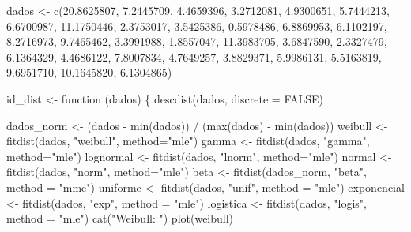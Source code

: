 \documentclass[
  letterpaper,
  DIV=11,
  numbers=noendperiod]{scrartcl}
\newenvironment{Shaded}{\begin{snugshade}}{\end{snugshade}}
\newcommand{\AttributeTok}[1]{\textcolor[rgb]{0.40,0.45,0.13}{#1}}
\newcommand{\ConstantTok}[1]{\textcolor[rgb]{0.56,0.35,0.01}{#1}}
\newcommand{\ControlFlowTok}[1]{\textcolor[rgb]{0.00,0.23,0.31}{#1}}
\newcommand{\FloatTok}[1]{\textcolor[rgb]{0.68,0.00,0.00}{#1}}
\newcommand{\FunctionTok}[1]{\textcolor[rgb]{0.28,0.35,0.67}{#1}}
\newcommand{\NormalTok}[1]{\textcolor[rgb]{0.00,0.23,0.31}{#1}}
\newcommand{\OtherTok}[1]{\textcolor[rgb]{0.00,0.23,0.31}{#1}}
\newcommand{\SpecialCharTok}[1]{\textcolor[rgb]{0.37,0.37,0.37}{#1}}
\newcommand{\StringTok}[1]{\textcolor[rgb]{0.13,0.47,0.30}{#1}}
\begin{document}
\begin{Shaded}
\begin{Highlighting}[]
\NormalTok{dados }\OtherTok{\textless{}{-}} \FunctionTok{c}\NormalTok{(}\FloatTok{20.8625807}\NormalTok{, }\FloatTok{7.2445709}\NormalTok{, }\FloatTok{4.4659396}\NormalTok{, }\FloatTok{3.2712081}\NormalTok{, }\FloatTok{4.9300651}\NormalTok{, }\FloatTok{5.7444213}\NormalTok{, }\FloatTok{6.6700987}\NormalTok{, }\FloatTok{11.1750446}\NormalTok{, }\FloatTok{2.3753017}\NormalTok{, }\FloatTok{3.5425386}\NormalTok{, }\FloatTok{0.5978486}\NormalTok{, }\FloatTok{6.8869953}\NormalTok{, }\FloatTok{6.1102197}\NormalTok{, }\FloatTok{8.2716973}\NormalTok{, }\FloatTok{9.7465462}\NormalTok{, }\FloatTok{3.3991988}\NormalTok{, }\FloatTok{1.8557047}\NormalTok{, }\FloatTok{11.3983705}\NormalTok{, }\FloatTok{3.6847590}\NormalTok{, }\FloatTok{2.3327479}\NormalTok{, }\FloatTok{6.1364329}\NormalTok{, }\FloatTok{4.4686122}\NormalTok{, }\FloatTok{7.8007834}\NormalTok{, }\FloatTok{4.7649257}\NormalTok{, }\FloatTok{3.8829371}\NormalTok{, }\FloatTok{5.9986131}\NormalTok{, }\FloatTok{5.5163819}\NormalTok{, }\FloatTok{9.6951710}\NormalTok{, }\FloatTok{10.1645820}\NormalTok{, }\FloatTok{6.1304865}\NormalTok{)}

\NormalTok{id\_dist }\OtherTok{\textless{}{-}} \ControlFlowTok{function}\NormalTok{ (dados) \{}
  \FunctionTok{descdist}\NormalTok{(dados, }\AttributeTok{discrete =} \ConstantTok{FALSE}\NormalTok{)}
  
\NormalTok{  dados\_norm }\OtherTok{\textless{}{-}}\NormalTok{ (dados }\SpecialCharTok{{-}} \FunctionTok{min}\NormalTok{(dados)) }\SpecialCharTok{/}\NormalTok{ (}\FunctionTok{max}\NormalTok{(dados) }\SpecialCharTok{{-}} \FunctionTok{min}\NormalTok{(dados))}
\NormalTok{  weibull }\OtherTok{\textless{}{-}} \FunctionTok{fitdist}\NormalTok{(dados, }\StringTok{"weibull"}\NormalTok{, }\AttributeTok{method=}\StringTok{"mle"}\NormalTok{)}
\NormalTok{  gamma }\OtherTok{\textless{}{-}} \FunctionTok{fitdist}\NormalTok{(dados, }\StringTok{"gamma"}\NormalTok{, }\AttributeTok{method=}\StringTok{"mle"}\NormalTok{)}
\NormalTok{  lognormal }\OtherTok{\textless{}{-}} \FunctionTok{fitdist}\NormalTok{(dados, }\StringTok{"lnorm"}\NormalTok{, }\AttributeTok{method=}\StringTok{"mle"}\NormalTok{)}
\NormalTok{  normal }\OtherTok{\textless{}{-}} \FunctionTok{fitdist}\NormalTok{(dados, }\StringTok{"norm"}\NormalTok{, }\AttributeTok{method=}\StringTok{"mle"}\NormalTok{)}
\NormalTok{  beta }\OtherTok{\textless{}{-}} \FunctionTok{fitdist}\NormalTok{(dados\_norm, }\StringTok{"beta"}\NormalTok{, }\AttributeTok{method =} \StringTok{"mme"}\NormalTok{)}
\NormalTok{  uniforme }\OtherTok{\textless{}{-}} \FunctionTok{fitdist}\NormalTok{(dados, }\StringTok{"unif"}\NormalTok{, }\AttributeTok{method =} \StringTok{"mle"}\NormalTok{)}
\NormalTok{  exponencial }\OtherTok{\textless{}{-}} \FunctionTok{fitdist}\NormalTok{(dados, }\StringTok{"exp"}\NormalTok{, }\AttributeTok{method =} \StringTok{"mle"}\NormalTok{)}
\NormalTok{  logistica }\OtherTok{\textless{}{-}} \FunctionTok{fitdist}\NormalTok{(dados, }\StringTok{"logis"}\NormalTok{, }\AttributeTok{method =} \StringTok{"mle"}\NormalTok{)}
  \FunctionTok{cat}\NormalTok{(}\StringTok{"Weibull: "}\NormalTok{)}
  \FunctionTok{plot}\NormalTok{(weibull)}
  

\end{Highlighting}
\end{Shaded}
\end{document}
